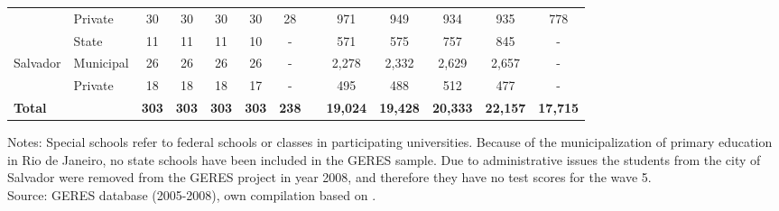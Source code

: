 \documentclass[a4paper, 12pt]{article}
\begin{document}
\begin{table}[H]
\begin{adjustbox}{width=1\textwidth}
\begin{tabular}{llllllllllllr}
          & Private & \multicolumn{1}{c}{30 } & \multicolumn{1}{c}{30 } & \multicolumn{1}{c}{30 } & \multicolumn{1}{c}{30 } & \multicolumn{1}{c}{28 } &       & \multicolumn{1}{c}{971 } & \multicolumn{1}{c}{949} & \multicolumn{1}{c}{934 } & \multicolumn{1}{c}{935 } & \multicolumn{1}{c}{778 } \\
\cmidrule{1-7}\cmidrule{9-13}          & State & \multicolumn{1}{c}{11 } & \multicolumn{1}{c}{11 } & \multicolumn{1}{c}{11 } & \multicolumn{1}{c}{10 } & \multicolumn{1}{c}{-} &       & \multicolumn{1}{c}{571 } & \multicolumn{1}{c}{575} & \multicolumn{1}{c}{757 } & \multicolumn{1}{c}{845 } & \multicolumn{1}{c}{-} \\
    Salvador & Municipal & \multicolumn{1}{c}{26 } & \multicolumn{1}{c}{26 } & \multicolumn{1}{c}{26 } & \multicolumn{1}{c}{26 } & \multicolumn{1}{c}{-} &       & \multicolumn{1}{c}{2,278 } & \multicolumn{1}{c}{2,332} & \multicolumn{1}{c}{2,629 } & \multicolumn{1}{c}{2,657 } & \multicolumn{1}{c}{-} \\
          & Private & \multicolumn{1}{c}{18 } & \multicolumn{1}{c}{18 } & \multicolumn{1}{c}{18 } & \multicolumn{1}{c}{17 } & \multicolumn{1}{c}{-} &       & \multicolumn{1}{c}{495 } & \multicolumn{1}{c}{488} & \multicolumn{1}{c}{512 } & \multicolumn{1}{c}{477 } & \multicolumn{1}{c}{-} \\
    \midrule
    \textbf{Total} &       & \multicolumn{1}{c}{\textbf{303 }} & \multicolumn{1}{c}{\textbf{303 }} & \multicolumn{1}{c}{\textbf{303 }} & \multicolumn{1}{c}{\textbf{303 }} & \multicolumn{1}{c}{\textbf{238 }} &       & \multicolumn{1}{c}{\textbf{19,024 }} & \multicolumn{1}{c}{\textbf{19,428 }} & \multicolumn{1}{c}{\textbf{20,333 }} & \multicolumn{1}{c}{\textbf{22,157 }} & \multicolumn{1}{c}{\textbf{17,715 }} \\
    \bottomrule
    \end{tabular}%
\end{adjustbox}
  \end{table}%

\vspace{-13pt} \hspace{-20pt}
    \begin{minipage}{1\textwidth} 
{\scriptsize
Notes: Special schools refer to federal schools or classes in participating universities. Because of the municipalization of primary education in Rio de Janeiro, no state schools have been included in the GERES sample. Due to administrative issues the students from the city of Salvador were removed from the GERES project in year 2008, and therefore they have no test scores for the wave 5. \\ Source: GERES database (2005-2008), own compilation based on \citet{brooke2011geres}.\par}
\end{minipage} 
\vspace{5pt}
\end{document}
